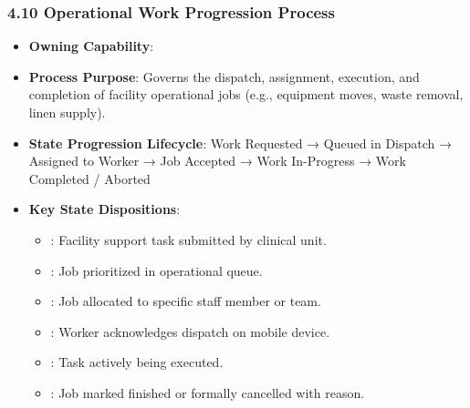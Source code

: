 \par\smallskip
{}\label{rad:processes:218}
\subsubsection*{4.10 Operational Work Progression Process}
\label{rad:processes:219}

\begin{itemize}

\item 
\textbf{Owning Capability}: \texttt{}



\item 
\textbf{Process Purpose}: Governs the dispatch, assignment, execution, and completion of facility operational jobs (e.g., equipment moves, waste removal, linen supply).



\item 
\textbf{State Progression Lifecycle}: Work Requested → Queued in Dispatch → Assigned to Worker → Job Accepted → Work In-Progress → Work Completed /\allowbreak{} Aborted



\item 
\textbf{Key State Dispositions}:


\begin{itemize}

\item 
\texttt{}: Facility support task submitted by clinical unit.



\item 
\texttt{}: Job prioritized in operational queue.



\item 
\texttt{}: Job allocated to specific staff member or team.



\item 
\texttt{}: Worker acknowledges dispatch on mobile device.



\item 
\texttt{}: Task actively being executed.



\item 
\texttt{}: Job marked finished or formally cancelled with reason.



\end{itemize}


\end{itemize}
\label{rad:processes:231}

